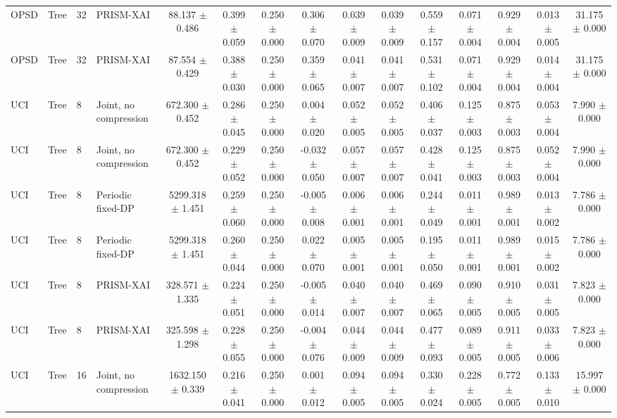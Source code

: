 \begin{table}[t]
\begin{tabular}{llllccccccccccc}
OPSD & Tree & 32 & PRISM-XAI & 88.137 $\pm$ 0.486 & 0.399 $\pm$ 0.059 & 0.250 $\pm$ 0.000 & 0.306 $\pm$ 0.070 & 0.039 $\pm$ 0.009 & 0.039 $\pm$ 0.009 & 0.559 $\pm$ 0.157 & 0.071 $\pm$ 0.004 & 0.929 $\pm$ 0.004 & 0.013 $\pm$ 0.005 & 31.175 $\pm$ 0.000 \\
OPSD & Tree & 32 & PRISM-XAI & 87.554 $\pm$ 0.429 & 0.388 $\pm$ 0.030 & 0.250 $\pm$ 0.000 & 0.359 $\pm$ 0.065 & 0.041 $\pm$ 0.007 & 0.041 $\pm$ 0.007 & 0.531 $\pm$ 0.102 & 0.071 $\pm$ 0.004 & 0.929 $\pm$ 0.004 & 0.014 $\pm$ 0.004 & 31.175 $\pm$ 0.000 \\
UCI & Tree & 8 & Joint, no compression & 672.300 $\pm$ 0.452 & 0.286 $\pm$ 0.045 & 0.250 $\pm$ 0.000 & 0.004 $\pm$ 0.020 & 0.052 $\pm$ 0.005 & 0.052 $\pm$ 0.005 & 0.406 $\pm$ 0.037 & 0.125 $\pm$ 0.003 & 0.875 $\pm$ 0.003 & 0.053 $\pm$ 0.004 & 7.990 $\pm$ 0.000 \\
UCI & Tree & 8 & Joint, no compression & 672.300 $\pm$ 0.452 & 0.229 $\pm$ 0.052 & 0.250 $\pm$ 0.000 & -0.032 $\pm$ 0.050 & 0.057 $\pm$ 0.007 & 0.057 $\pm$ 0.007 & 0.428 $\pm$ 0.041 & 0.125 $\pm$ 0.003 & 0.875 $\pm$ 0.003 & 0.052 $\pm$ 0.004 & 7.990 $\pm$ 0.000 \\
UCI & Tree & 8 & Periodic fixed-DP & 5299.318 $\pm$ 1.451 & 0.259 $\pm$ 0.060 & 0.250 $\pm$ 0.000 & -0.005 $\pm$ 0.008 & 0.006 $\pm$ 0.001 & 0.006 $\pm$ 0.001 & 0.244 $\pm$ 0.049 & 0.011 $\pm$ 0.001 & 0.989 $\pm$ 0.001 & 0.013 $\pm$ 0.002 & 7.786 $\pm$ 0.000 \\
UCI & Tree & 8 & Periodic fixed-DP & 5299.318 $\pm$ 1.451 & 0.260 $\pm$ 0.044 & 0.250 $\pm$ 0.000 & 0.022 $\pm$ 0.070 & 0.005 $\pm$ 0.001 & 0.005 $\pm$ 0.001 & 0.195 $\pm$ 0.050 & 0.011 $\pm$ 0.001 & 0.989 $\pm$ 0.001 & 0.015 $\pm$ 0.002 & 7.786 $\pm$ 0.000 \\
UCI & Tree & 8 & PRISM-XAI & 328.571 $\pm$ 1.335 & 0.224 $\pm$ 0.051 & 0.250 $\pm$ 0.000 & -0.005 $\pm$ 0.014 & 0.040 $\pm$ 0.007 & 0.040 $\pm$ 0.007 & 0.469 $\pm$ 0.065 & 0.090 $\pm$ 0.005 & 0.910 $\pm$ 0.005 & 0.031 $\pm$ 0.005 & 7.823 $\pm$ 0.000 \\
UCI & Tree & 8 & PRISM-XAI & 325.598 $\pm$ 1.298 & 0.228 $\pm$ 0.055 & 0.250 $\pm$ 0.000 & -0.004 $\pm$ 0.076 & 0.044 $\pm$ 0.009 & 0.044 $\pm$ 0.009 & 0.477 $\pm$ 0.093 & 0.089 $\pm$ 0.005 & 0.911 $\pm$ 0.005 & 0.033 $\pm$ 0.006 & 7.823 $\pm$ 0.000 \\
UCI & Tree & 16 & Joint, no compression & 1632.150 $\pm$ 0.339 & 0.216 $\pm$ 0.041 & 0.250 $\pm$ 0.000 & 0.001 $\pm$ 0.012 & 0.094 $\pm$ 0.005 & 0.094 $\pm$ 0.005 & 0.330 $\pm$ 0.024 & 0.228 $\pm$ 0.005 & 0.772 $\pm$ 0.005 & 0.133 $\pm$ 0.010 & 15.997 $\pm$ 0.000 \\

\end{tabular}
\end{table}

